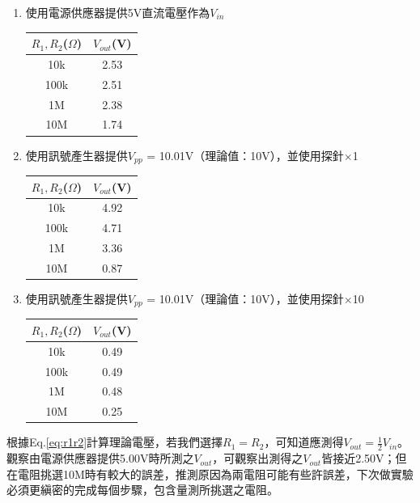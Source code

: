 \documentclass[12pt,a4paper]{article}
\begin{document}
\begin{CJK}{UTF8}{bkai}
\begin{enumerate}
    \item 使用電源供應器提供5V直流電壓作為$V_{in}$\\
    \begin{center}
    \begin{tabular}{c|c}
    \hline
    $R_{1},R_{2}$($\Omega$)   &   $V_{out}$(V)\\
    \hline
    \hline
    10k &   2.53\\\hline
    100k    &   2.51\\\hline
    1M &   2.38\\\hline
    10M  &   1.74\\\hline
    \end{tabular}
    \end{center}
    \clearpage
    \item 使用訊號產生器提供$V_{pp}$ = 10.01V（理論值：10V），並使用探針$\times$1\\
    \begin{center}
    \begin{tabular}{c|c}
    \hline
    $R_{1}, R_{2}$($\Omega$)    &   $V_{out}$(V)\\
    \hline
    \hline
    10k &   4.92\\\hline
    100k    &   4.71\\\hline
    1M &   3.36\\\hline
    10M  &   0.87\\\hline
    \end{tabular}
    \end{center}
    \item 使用訊號產生器提供$V_{pp}$ = 10.01V（理論值：10V），並使用探針$\times$10\\
    \begin{center}
    \begin{tabular}{c|c}
    \hline
    $R_{1}, R_{2}$($\Omega$)    &   $V_{out}$(V)\\
    \hline
    \hline
    10k &   0.49\\\hline
    100k    &   0.49\\\hline
    1M &   0.48\\\hline
    10M  &   0.25\\\hline
    \end{tabular}
    \end{center}
\end{enumerate}

根據Eq.\ref{eq:r1r2}計算理論電壓，若我們選擇$R_{1} = R_{2}$，可知道應測得$V_{out}=\frac{1}{2}V_{in}$。
觀察由電源供應器提供5.00V時所測之$V_{out}$，可觀察出測得之$V_{out}$皆接近2.50V；但在電阻挑選10M時有較大的誤差，推測原因為兩電阻可能有些許誤差，下次做實驗必須更縝密的完成每個步驟，包含量測所挑選之電阻。


\end{CJK}
\end{document}
